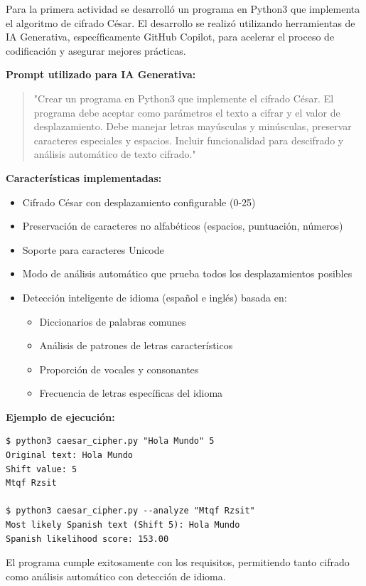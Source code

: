 \documentclass[letter,12pt]{article}
\begin{document}
Para la primera actividad se desarrolló un programa en Python3 que implementa el algoritmo de cifrado César. El desarrollo se realizó utilizando herramientas de IA Generativa, específicamente GitHub Copilot, para acelerar el proceso de codificación y asegurar mejores prácticas.

\textbf{Prompt utilizado para IA Generativa:}
\begin{quote}
"Crear un programa en Python3 que implemente el cifrado César. El programa debe aceptar como parámetros el texto a cifrar y el valor de desplazamiento. Debe manejar letras mayúsculas y minúsculas, preservar caracteres especiales y espacios. Incluir funcionalidad para descifrado y análisis automático de texto cifrado."
\end{quote}

\textbf{Características implementadas:}
\begin{itemize}
    \item Cifrado César con desplazamiento configurable (0-25)
    \item Preservación de caracteres no alfabéticos (espacios, puntuación, números)
    \item Soporte para caracteres Unicode
    \item Modo de análisis automático que prueba todos los desplazamientos posibles
    \item Detección inteligente de idioma (español e inglés) basada en:
    \begin{itemize}
        \item Diccionarios de palabras comunes
        \item Análisis de patrones de letras característicos
        \item Proporción de vocales y consonantes
        \item Frecuencia de letras específicas del idioma
    \end{itemize}
\end{itemize}

\textbf{Ejemplo de ejecución:}
\begin{verbatim}
$ python3 caesar_cipher.py "Hola Mundo" 5
Original text: Hola Mundo
Shift value: 5
Mtqf Rzsit

$ python3 caesar_cipher.py --analyze "Mtqf Rzsit"
Most likely Spanish text (Shift 5): Hola Mundo
Spanish likelihood score: 153.00
\end{verbatim}

El programa cumple exitosamente con los requisitos, permitiendo tanto cifrado como análisis automático con detección de idioma.
\end{document}
